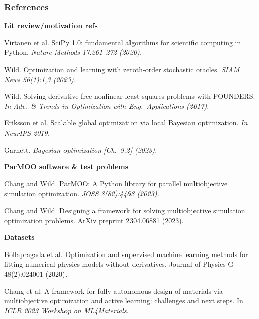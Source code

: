 \documentclass[aspectratio=169]{beamer}
\begin{document}
\begin{frame}\frametitle{References}

{\small\bf Lit review/motivation refs}\\

{\tiny\it

%
%
%
%
%
%
%

Virtanen et al.
SciPy 1.0: fundamental algorithms for scientific computing in Python.
{\sl Nature Methods 17:261--272 (2020).}

\smallskip

Wild. Optimization and learning with zeroth-order stochastic oracles.
{\sl SIAM News 56(1):1,3 (2023).}

\smallskip

Wild.
Solving derivative-free nonlinear least squares problems with POUNDERS.
{\sl In Adv.\ \& Trends in Optimization with Eng.\ Applications
(2017).}

\smallskip

Eriksson et al.
Scalable global optimization via local Bayesian optimization.
{\sl In NeurIPS 2019.}

\smallskip

Garnett. {\sl Bayesian optimization [Ch.\ 9.2] (2023).}

}

\medskip

{\small\bf ParMOO software \& test problems}\\

{\tiny\it

Chang and Wild.
ParMOO: A Python library for parallel multiobjective simulation optimization.
{\sl JOSS 8(82):4468 (2023).}

\medskip

Chang and Wild.
Designing a framework for solving multiobjective simulation optimization problems.
ArXiv preprint 2304.06881 (2023).

}

\medskip

{\small\bf Datasets}\\

{\tiny\it

Bollapragada et al.
Optimization and supervised machine learning methods for fitting numerical physics models without derivatives.
Journal of Physics G 48(2):024001 (2020).

\medskip

Chang et al.
A framework for fully autonomous design of materials via multiobjective optimization and active learning: challenges and next steps.
In {\sl ICLR 2023 Workshop on ML4Materials}.

}
\end{frame}
\end{document}
